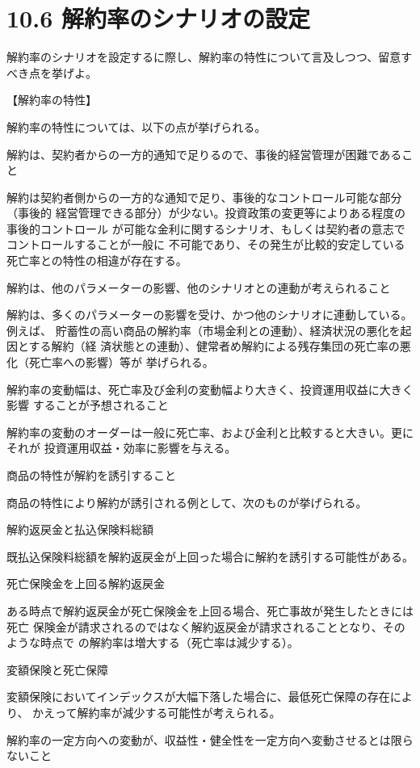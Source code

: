 \documentclass[report,gutter=10mm,fore-edge=10mm,uplatex,dvipdfmx]{jlreq}
\begin{document}
\section{10.6 解約率のシナリオの設定}
解約率のシナリオを設定するに際し、解約率の特性について言及しつつ、留意すべき点を挙げよ。

\answer{}
【解約率の特性】

解約率の特性については、以下の点が挙げられる。

解約は、契約者からの一方的通知で足りるので、事後的経営管理が困難であること

解約は契約者側からの一方的な通知で足り、事後的なコントロール可能な部分（事後的
経営管理できる部分）が少ない。投資政策の変更等によりある程度の事後的コントロール
が可能な金利に関するシナリオ、もしくは契約者の意志でコントロールすることが一般に
不可能であり、その発生が比較的安定している死亡率との特性の相違が存在する。

解約は、他のパラメーターの影響、他のシナリオとの連動が考えられること

解約は、多くのパラメーターの影響を受け、かつ他のシナリオに連動している。例えば、
貯蓄性の高い商品の解約率（市場金利との連動）、経済状況の悪化を起因とする解約（経
済状態との連動）、健常者め解約による残存集団の死亡率の悪化（死亡率への影響）等が
挙げられる。

解約率の変動幅は、死亡率及び金利の変動幅より大きく、投資運用収益に大きく影響
することが予想されること

解約率の変動のオーダーは一般に死亡率、および金利と比較すると大きい。更にそれが
投資運用収益・効率に影響を与える。

商品の特性が解約を誘引すること

商品の特性により解約が誘引される例として、次のものが挙げられる。

解約返戻金と払込保険料総額

既払込保険料総額を解約返戻金が上回った場合に解約を誘引する可能性がある。

死亡保険金を上回る解約返戻金

ある時点で解約返戻金が死亡保険金を上回る場合、死亡事故が発生したときには死亡
保険金が請求されるのではなく解約返戻金が請求されることとなり、そのような時点で
の解約率は増大する（死亡率は減少する）。

変額保険と死亡保障

変額保険においてインデックスが大幅下落した場合に、最低死亡保障の存在により、
かえって解約率が減少する可能性が考えられる。

解約率の一定方向への変動が、収益性・健全性を一定方向へ変動させるとは限らないこと
\end{document}

